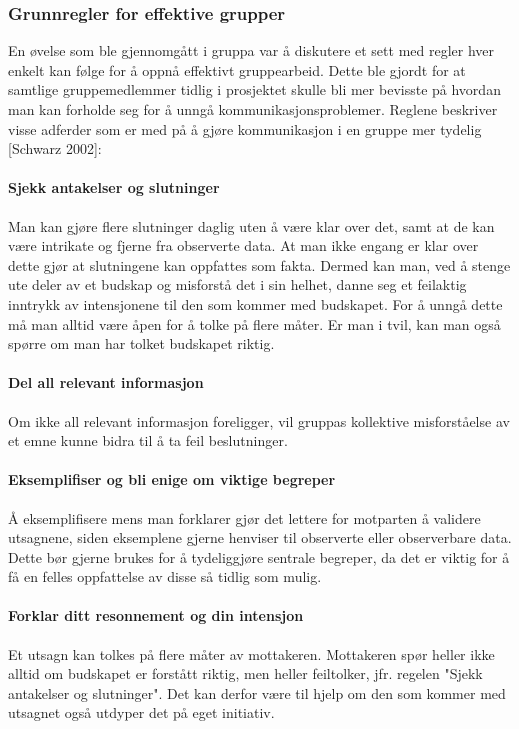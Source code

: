 \subsubsection{Grunnregler for effektive grupper}

En øvelse som ble gjennomgått i gruppa var å diskutere et sett med regler hver enkelt kan følge for å oppnå effektivt gruppearbeid.
Dette ble gjordt for at samtlige gruppemedlemmer tidlig i prosjektet skulle bli mer bevisste på hvordan man kan forholde seg for å unngå kommunikasjonsproblemer.
Reglene beskriver visse adferder som er med på å gjøre kommunikasjon i en gruppe mer tydelig [Schwarz 2002]:

\paragraph{Sjekk antakelser og slutninger}
Man kan gjøre flere slutninger daglig uten å være klar over det, samt at de kan være intrikate og fjerne fra observerte data.
At man ikke engang er klar over dette gjør at slutningene kan oppfattes som fakta.
Dermed kan man, ved å stenge ute deler av et budskap og misforstå det i sin helhet, danne seg et feilaktig inntrykk av intensjonene til den som kommer med budskapet.
For å unngå dette må man alltid være åpen for å tolke på flere måter.
Er man i tvil, kan man også spørre om man har tolket budskapet riktig.

\paragraph{Del all relevant informasjon}
Om ikke all relevant informasjon foreligger, vil gruppas kollektive misforståelse av et emne kunne bidra til å ta feil beslutninger.

\paragraph{Eksemplifiser og bli enige om viktige begreper}
Å eksemplifisere mens man forklarer gjør det lettere for motparten å validere utsagnene, siden eksemplene gjerne henviser til observerte eller observerbare data.
Dette bør gjerne brukes for å tydeliggjøre sentrale begreper, da det er viktig for å få en felles oppfattelse av disse så tidlig som mulig.

\paragraph{Forklar ditt resonnement og din intensjon}\label{forklardittres}
Et utsagn kan tolkes på flere måter av mottakeren.
Mottakeren spør heller ikke alltid om budskapet er forstått riktig, men heller feiltolker, jfr. regelen "Sjekk antakelser og slutninger".
Det kan derfor være til hjelp om den som kommer med utsagnet også utdyper det på eget initiativ.

